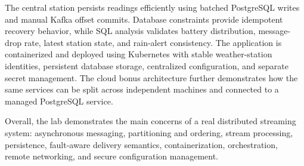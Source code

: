 \documentclass[12pt,a4paper]{article}
\begin{document}
The central station persists readings efficiently using batched PostgreSQL writes and manual Kafka offset commits. Database constraints provide idempotent recovery behavior, while SQL analysis validates battery distribution, message-drop rate, latest station state, and rain-alert consistency. The application is containerized and deployed using Kubernetes with stable weather-station identities, persistent database storage, centralized configuration, and separate secret management. The cloud bonus architecture further demonstrates how the same services can be split across independent machines and connected to a managed PostgreSQL service.

Overall, the lab demonstrates the main concerns of a real distributed streaming system: asynchronous messaging, partitioning and ordering, stream processing, persistence, fault-aware delivery semantics, containerization, orchestration, remote networking, and secure configuration management.
\end{document}
